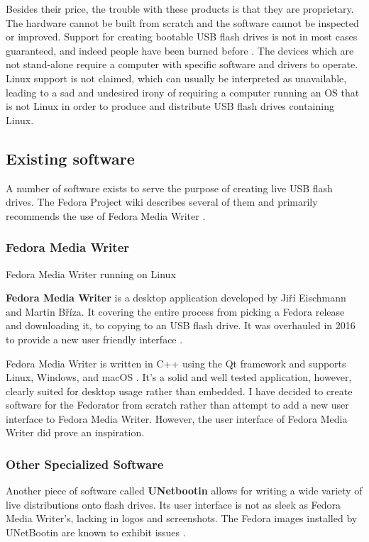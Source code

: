             Besides their price, the trouble with these products is that they are proprietary.  The hardware cannot be built from scratch and the software cannot be inspected or improved.  Support for creating bootable USB flash drives is not in most cases guaranteed, and indeed people have been burned before \cite{open-security-research-simple-duplicator}.  The devices which are not stand-alone require a computer with specific software and drivers to operate.  Linux support is not claimed, which can usually be interpreted as unavailable, leading to a sad and undesired irony of requiring a computer running an OS that is not Linux in order to produce and distribute USB flash drives containing Linux.
        \subsection{Existing software}
            A number of software exists to serve the purpose of creating live USB flash drives.  The Fedora Project wiki describes several of them and primarily recommends the use of Fedora Media Writer \cite{fedora-how-to-live-usb}.
            
            \subsubsection{Fedora Media Writer}
                    {Fedora Media Writer running on Linux  \cite{fedora-media-writer-screenshot}}
                
                \textbf{Fedora Media Writer} is a desktop application developed by Jiří Eischmann and Martin Bříza.  It covering the entire process from picking a Fedora release and downloading it, to copying to an USB flash drive.  It was overhauled in 2016 to provide a new user friendly interface \cite{fedora-luc-as-primary-downloadable}.
                
                Fedora Media Writer is written in C++ using the Qt framework and supports Linux, Windows, and macOS \cite{fedora-media-writer}.  It's a solid and well tested application, however, clearly suited for desktop usage rather than embedded.  I have decided to create software for the Fedorator from scratch rather than attempt to add a new user interface to Fedora Media Writer.  However, the user interface of Fedora Media Writer did prove an inspiration.
                
            \subsubsection{Other Specialized Software}
                Another piece of software called \textbf{UNetbootin} allows for writing a wide variety of live distributions onto flash drives.  Its user interface is not as sleek as Fedora Media Writer's, lacking in logos and screenshots.  The Fedora images installed by UNetBootin are known to exhibit issues \cite{fedora-how-to-live-usb} \cite{unix-stack-exchange-error-installing-fedora-24}.
            
